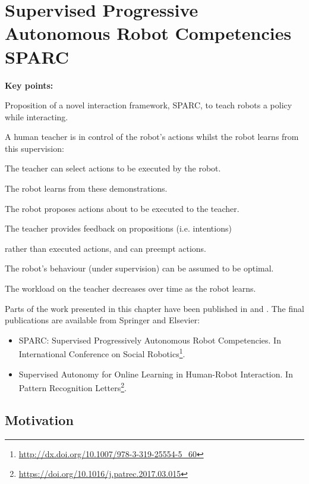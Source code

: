 \chapter{Supervised Progressive Autonomous Robot \newline Competencies SPARC}\label{chap:sparc}
\glsresetall
\graphicspath{{images/sparc/}}

\newcommand{\SubItem}[2]{
	{\vspace{-.4cm}\setlength\itemindent{15pt} \item[#1] #2}
}

\begin{framed}
	\textbf{Key points:}
	\begin{itemize}
		\item Proposition of a novel interaction framework, SPARC, to teach robots a policy while interacting.
		\item A human teacher is in control of the robot's actions whilst the robot learns from this supervision:
		\SubItem{-}{The teacher can select actions to be executed by the robot.}
		\SubItem{-}{The robot learns from these demonstrations.}
		\SubItem{-}{The robot proposes actions about to be executed to the teacher.}
		\SubItem{-}{The teacher provides feedback on propositions (i.e. intentions)}
		\SubItem{}{ rather than executed actions, and can preempt actions.}
		\item The robot's behaviour (under supervision) can be assumed to be optimal.
		\item The workload on the teacher decreases over time as the robot learns.
	\end{itemize}
\end{framed}

Parts of the work presented in this chapter have been published in \cite{senft2015sparc} and \cite{senft2017supervised}. The final publications are available from Springer and Elsevier:
\begin{itemize}
	\item SPARC: Supervised	Progressively Autonomous Robot Competencies. In International Conference on	Social Robotics\footnote{\url{http://dx.doi.org/10.1007/978-3-319-25554-5_60}}.
	\item Supervised Autonomy for Online Learning in Human-Robot Interaction. In Pattern Recognition Letters\footnote{\url{https://doi.org/10.1016/j.patrec.2017.03.015}}.
\end{itemize}
\newpage
\section{Motivation}

